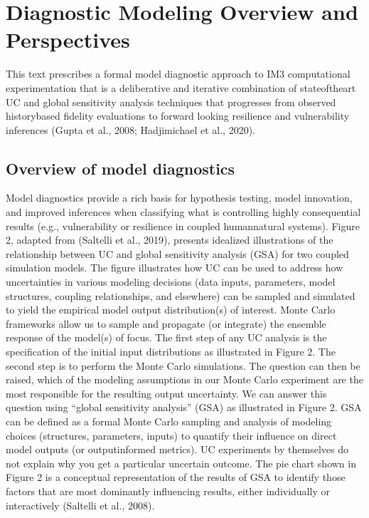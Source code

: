 \documentclass[letterpaper,10pt,english]{sphinxmanual}
\begin{document}
\chapter{Diagnostic Modeling Overview and Perspectives}
\label{\detokenize{2_diagnostic_modeling_overview_and_perspectives:diagnostic-modeling-overview-and-perspectives}}\label{\detokenize{2_diagnostic_modeling_overview_and_perspectives::doc}}
\sphinxAtStartPar
This text prescribes a formal model diagnostic approach to IM3 computational experimentation that is a deliberative and iterative combination of state\sphinxhyphen{}of\sphinxhyphen{}the\sphinxhyphen{}art UC and global sensitivity analysis techniques that progresses from observed history\sphinxhyphen{}based fidelity evaluations to forward looking resilience and vulnerability inferences (Gupta et al., 2008; Hadjimichael et al., 2020).


\section{Overview of model diagnostics}
\label{\detokenize{2_diagnostic_modeling_overview_and_perspectives:overview-of-model-diagnostics}}
\sphinxAtStartPar
Model diagnostics provide a rich basis for hypothesis testing, model innovation, and improved inferences when classifying what is controlling highly consequential results (e.g., vulnerability or resilience in coupled human\sphinxhyphen{}natural systems). Figure 2, adapted from (Saltelli et al., 2019), presents idealized illustrations of the relationship between UC and global sensitivity analysis (GSA) for two coupled simulation models. The figure illustrates how UC can be used to address how uncertainties in various modeling decisions (data inputs, parameters, model structures, coupling relationships, and elsewhere) can be sampled and simulated to yield the empirical model output distribution(s) of interest. Monte Carlo frameworks allow us to sample and propagate (or integrate) the ensemble response of the model(s) of focus. The first step of any UC analysis is the specification of the initial input distributions as illustrated in Figure 2. The second step is to perform the Monte Carlo simulations. The question can then be raised, which of the modeling assumptions in our Monte Carlo experiment are the most responsible for the resulting output uncertainty. We can answer this question using “global sensitivity analysis” (GSA) as illustrated in Figure 2. GSA can be defined as a formal Monte Carlo sampling and analysis of modeling choices (structures, parameters, inputs) to quantify their influence on direct model outputs (or output\sphinxhyphen{}informed metrics). UC experiments by themselves do not explain why you get a particular uncertain outcome. The pie chart shown in Figure 2 is a conceptual representation of the results of GSA to identify those factors that are most dominantly influencing results, either individually or interactively (Saltelli et al., 2008).
\end{document}
